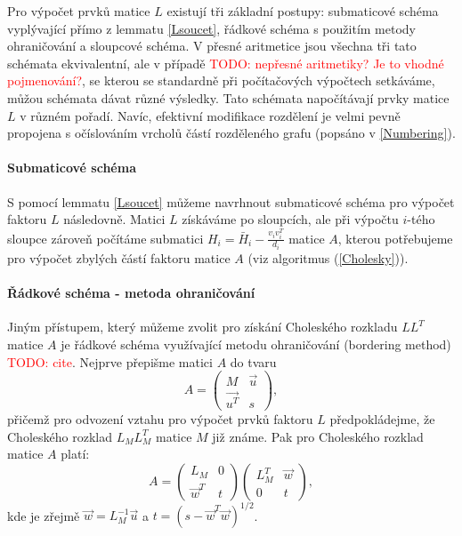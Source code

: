 \documentclass[11pt,american,czech,oneside]{book}
\theoremstyle{plain}
\theoremstyle{definition}
\newcommand{\TODO}[1]{\textcolor{red}{TODO: #1}}
\begin{document}
Pro výpočet prvků matice $L$ existují tři základní postupy: submaticové schéma vyplývající přímo z lemmatu \ref{Lsoucet}, řádkové schéma s použitím metody ohraničování a sloupcové schéma. V přesné aritmetice jsou všechna tři tato schémata ekvivalentní, ale v případě \TODO{nepřesné aritmetiky? Je to vhodné pojmenování?}, se kterou se standardně při počítačových výpočtech setkáváme, můžou schémata dávat různé výsledky. Tato schémata napočítávají prvky matice $L$ v různém pořadí. Navíc, efektivní modifikace rozdělení je velmi pevně propojena s očíslováním vrcholů částí rozděleného grafu (popsáno v \ref{Numbering}).

\paragraph{Submaticové schéma}
S pomocí lemmatu \ref{Lsoucet} můžeme navrhnout submaticové schéma pro výpočet faktoru $L$ následovně. Matici $L$ získáváme po sloupcích, ale při výpočtu $i$-tého sloupce zároveň počítáme submatici $H_i = \bar{H}_i-\frac{v_i v_i^T}{d_i}$ matice $A$, kterou potřebujeme pro výpočet zbylých částí faktoru matice $A$ (viz algoritmus (\ref{Cholesky})).

\paragraph{Řádkové schéma - metoda ohraničování}
Jiným přístupem, který můžeme zvolit pro získání Choleského rozkladu $L L^T$ matice $A$ je řádkové schéma využívající metodu ohraničování (bordering method) \TODO{cite}. Nejprve přepišme matici $A$ do tvaru
\[
A =
\begin{pmatrix}
  M & \vec{u} \\
  \vec{u^T} & s
\end{pmatrix},
\]
přičemž pro odvození vztahu pro výpočet prvků faktoru $L$ předpokládejme, že Choleského rozklad $L_M L_M^T$ matice $M$ již známe. Pak pro Choleského rozklad matice $A$ platí:
\[
A =
\begin{pmatrix}
  L_M & 0 \\
  \vec{w}^T & t
\end{pmatrix}
\begin{pmatrix}
  L_M^T & \vec{w} \\
  0 & t
\end{pmatrix},
\]
kde je zřejmě $\vec{w}=L_M^{-1}\vec{u}$ a $t=(s-\vec{w}^T\vec{w})^{1/2}$.
\end{document}
